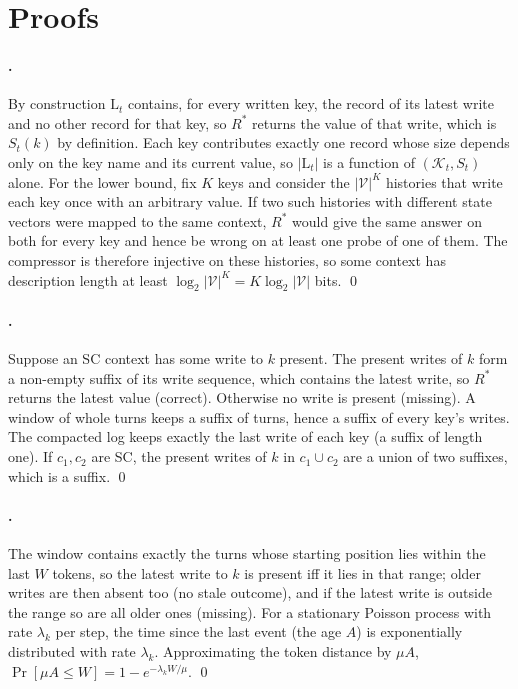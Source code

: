 \section{Proofs}
\sloppy
\label{app:proofs}

\paragraph{.} By construction $\mathrm{L}_t$ contains,
for every written key, the record of its latest write and no other record for
that key, so $R^\ast$ returns the value of that write, which is $S_t(k)$ by
definition. Each key contributes exactly one record whose size depends only on
the key name and its current value, so $|\mathrm{L}_t|$ is a function of
$(\mathcal{K}_t, S_t)$ alone. For the lower bound, fix $K$ keys and consider the
$|\mathcal{V}|^K$ histories that write each key once with an arbitrary value.
If two such histories with different state vectors were mapped to the same
context, $R^\ast$ would give the same answer on both for every key and hence be
wrong on at least one probe of one of them. The compressor is therefore
injective on these histories, so some context has description length at least
$\log_2|\mathcal{V}|^K = K\log_2|\mathcal{V}|$ bits. \qed

\paragraph{.} Suppose an SC context has some write to $k$
present. The present writes of $k$ form a non-empty suffix of its write
sequence, which contains the latest write, so $R^\ast$ returns the latest value
(correct). Otherwise no write is present (missing). A window of whole turns
keeps a suffix of turns, hence a suffix of every key's writes. The compacted log
keeps exactly the last write of each key (a suffix of length one). If $c_1,c_2$
are SC, the present writes of $k$ in $c_1\cup c_2$ are a union of two suffixes,
which is a suffix. \qed

\paragraph{.} The window contains exactly the turns whose
starting position lies within the last $W$ tokens, so the latest write to $k$
is present iff it lies in that range; older writes are then absent too (no
stale outcome), and if the latest write is outside the range so are all older
ones (missing). For a stationary Poisson process with rate $\lambda_k$ per step,
the time since the last event (the age $A$) is exponentially distributed with
rate $\lambda_k$. Approximating the token distance by $\mu A$,
$\Pr[\mu A\le W]=1-e^{-\lambda_k W/\mu}$. \qed

